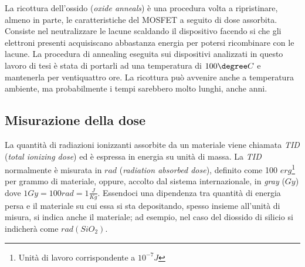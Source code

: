 \vspace{0.5cm}

La ricottura dell'ossido (\textit{oxide anneals}) è una procedura volta a ripristinare, almeno in parte, le caratteristiche del MOSFET a seguito di dose assorbita.
Consiste nel neutralizzare le lacune scaldando il dispositivo facendo si che gli elettroni presenti acquisiscano abbastanza energia per potersi ricombinare con le lacune. La procedura di annealing eseguita sui dispositivi analizzati in questo lavoro di tesi è stata di portarli ad una temperatura di $100\degree C$ e mantenerla per ventiquattro ore. La ricottura può avvenire anche a temperatura ambiente, ma probabilmente i tempi sarebbero molto lunghi, anche anni\cite{bib:Effetti_Radiazioni_NASA}. 

\subsection{Misurazione della dose}
La quantità di radiazioni ionizzanti assorbite da un materiale viene chiamata \textit{TID} (\textit{total ionizing dose}) ed è espressa in energia su unità di massa.
La \textit{TID} normalmente è misurata in $rad$ (\textit{radiation absorbed dose}), definito come 100 $erg$\footnote{Unità di lavoro corrispondente a $10^{-7} J$} per grammo di materiale, oppure, accolto dal sistema internazionale, in \textit{gray} ($Gy$) dove $1 Gy = 100rad = 1\frac{J}{Kg}$.
Essendoci una dipendenza tra quantità di energia persa e il materiale su cui essa si sta depositando, spesso insieme all'unità di misura, si indica anche il materiale; ad esempio, nel caso del diossido di silicio si indicherà come $rad(SiO_{2})$. 




